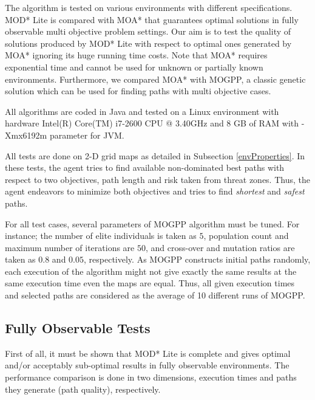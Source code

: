 \documentclass[10pt,journal]{IEEEtran}
\begin{document}
The algorithm is tested on various environments with different specifications. MOD* Lite is compared with MOA* that guarantees optimal solutions in fully observable multi objective problem settings. Our aim is to test the quality of solutions produced by MOD* Lite with respect to optimal ones generated by MOA* ignoring its huge running time costs. Note that MOA* requires exponential time and cannot be used for unknown or partially known environments.  Furthermore, we  compared MOA* with MOGPP, a classic genetic solution which can be used for finding paths with multi objective cases.

All algorithms are coded in Java and tested on a Linux environment with hardware Intel(R) Core(TM) i7-2600 CPU @ 3.40GHz and 8 GB of RAM with -Xmx6192m parameter for JVM.

All tests are done on 2-D grid maps as detailed in Subsection \ref{envProperties}. In these tests, the agent tries to find available non-dominated best paths with respect to two objectives, path length and risk taken from threat zones. Thus, the agent endeavors to minimize both objectives and tries to find \textit{shortest} and \textit{safest} paths.

For all test cases, several parameters of MOGPP algorithm must be tuned. For instance; the number of elite individuals is taken as $5$, population count and maximum number of iterations are $50$, and cross-over and mutation ratios are taken as $0.8$ and $0.05$, respectively. As MOGPP constructs initial paths randomly, each execution of the algorithm might not give exactly the same results at the same execution time even the maps are equal. Thus, all given execution times and selected paths are considered as the average of 10 different runs of MOGPP.

\subsection{Fully Observable Tests}

First of all, it must be shown that MOD* Lite is complete and gives optimal and/or acceptably sub-optimal results in fully observable environments. The performance comparison is done in two dimensions, execution times and paths they generate (path quality), respectively.
\end{document}
